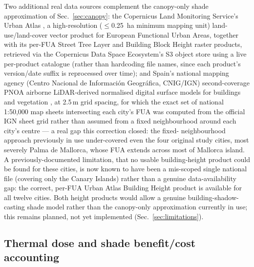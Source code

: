 \documentclass[pdflatex,sn-mathphys-ay]{sn-jnl}
\begin{document}
Two additional real data sources complement the canopy-only shade
approximation of Sec.~\ref{sec:canopy}: the Copernicus Land Monitoring
Service's Urban Atlas \cite{urban_atlas}, a high-resolution
($\leq$0.25~ha minimum mapping unit) land-use/land-cover vector product for
European Functional Urban Areas, together with its per-FUA Street Tree Layer
and Building Block Height raster products, retrieved via the Copernicus Data
Space Ecosystem's S3 object store using a live per-product catalogue (rather
than hardcoding file names, since each product's version/date suffix is
reprocessed over time); and Spain's national mapping agency (Centro Nacional
de Informaci\'on Geogr\'afica, CNIG/IGN) second-coverage PNOA airborne
LiDAR-derived normalised digital surface models for buildings and vegetation
\cite{cnig_pnoa_lidar}, at 2.5\,m grid spacing, for which the exact set of
national 1:50{,}000 map sheets intersecting each city's FUA was computed from
the official IGN sheet grid rather than assumed from a fixed neighbourhood
around each city's centre --- a real gap this correction closed: the fixed-
neighbourhood approach previously in use under-covered even the four
original study cities, most severely Palma de Mallorca, whose FUA extends
across most of Mallorca island. A previously-documented limitation, that no
usable building-height product could be found for these cities, is now known
to have been a mis-scoped single national file (covering only the Canary
Islands) rather than a genuine data-availability gap: the correct, per-FUA
Urban Atlas Building Height product is available for all twelve cities.
Both height products would allow a genuine building-shadow-casting shade
model rather than the canopy-only approximation currently in use; this
remains planned, not yet implemented (Sec.~\ref{sec:limitations}).

\subsection{Thermal dose and shade benefit/cost accounting}
\label{sec:dosebenefit}
\end{document}
